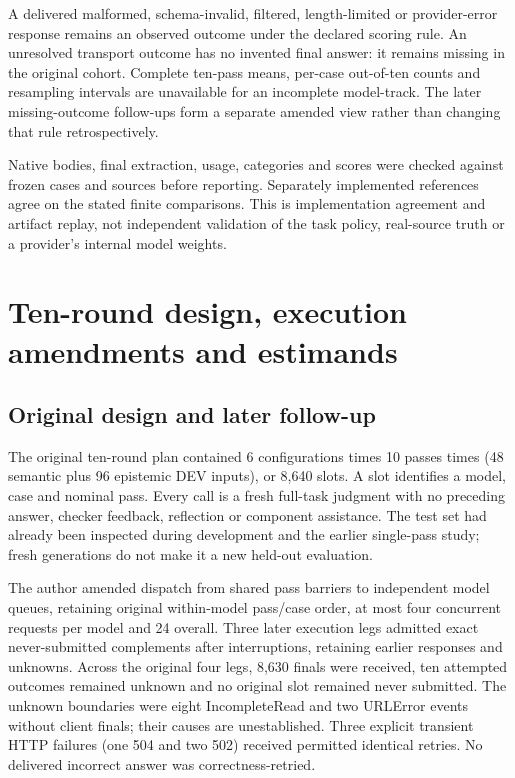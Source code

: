 \documentclass[a4paper,preprint,12pt,numbers,nopreprintline]{elsarticle}
\begin{document}
A delivered malformed, schema-invalid, filtered, length-limited or provider-error response remains an observed outcome under the declared scoring rule. An unresolved transport outcome has no invented final answer: it remains missing in the original cohort. Complete ten-pass means, per-case out-of-ten counts and resampling intervals are unavailable for an incomplete model-track. The later missing-outcome follow-ups form a separate amended view rather than changing that rule retrospectively.

Native bodies, final extraction, usage, categories and scores were checked against frozen cases and sources before reporting. Separately implemented references agree on the stated finite comparisons. This is implementation agreement and artifact replay, not independent validation of the task policy, real-source truth or a provider's internal model weights.

\section{Ten-round design, execution amendments and estimands}\label{sec:replication}
\subsection{Original design and later follow-up}
The original ten-round plan contained 6 configurations times 10 passes times (48 semantic plus 96 epistemic DEV inputs), or 8,640 slots. A slot identifies a model, case and nominal pass. Every call is a fresh full-task judgment with no preceding answer, checker feedback, reflection or component assistance. The test set had already been inspected during development and the earlier single-pass study; fresh generations do not make it a new held-out evaluation.

The author amended dispatch from shared pass barriers to independent model queues, retaining original within-model pass/case order, at most four concurrent requests per model and 24 overall. Three later execution legs admitted exact never-submitted complements after interruptions, retaining earlier responses and unknowns. Across the original four legs, 8,630 finals were received, ten attempted outcomes remained unknown and no original slot remained never submitted. The unknown boundaries were eight IncompleteRead and two URLError events without client finals; their causes are unestablished. Three explicit transient HTTP failures (one 504 and two 502) received permitted identical retries. No delivered incorrect answer was correctness-retried.
\end{document}
